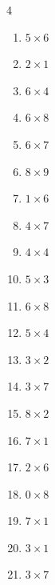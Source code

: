 \begin{multicols}{4}
\begin{enumerate}
  \item $5\times 6$
        \phantom{$=30$}

  \item $2\times 1$
        \phantom{$=2$}

  \item $6\times 4$
        \phantom{$=24$}

  \item $6\times 8$
        \phantom{$=48$}

  \item $6\times 7$
        \phantom{$=42$}

  \item $8\times 9$
        \phantom{$=72$}

  \item $1\times 6$
        \phantom{$=6$}

  \item $4\times 7$
        \phantom{$=28$}

  \item $4\times 4$
        \phantom{$=16$}

  \item $5\times 3$
        \phantom{$=15$}

  \item $6\times 8$
        \phantom{$=48$}

  \item $5\times 4$
        \phantom{$=20$}

  \item $3\times 2$
        \phantom{$=6$}

  \item $3\times 7$
        \phantom{$=21$}

  \item $8\times 2$
        \phantom{$=16$}

  \item $7\times 1$
        \phantom{$=7$}

  \item $2\times 6$
        \phantom{$=12$}

  \item $0\times 8$
        \phantom{$=0$}

  \item $7\times 1$
        \phantom{$=7$}

  \item $3\times 1$
        \phantom{$=3$}

  \item $3\times 7$
        \phantom{$=21$}


\end{enumerate}
\end{multicols}
